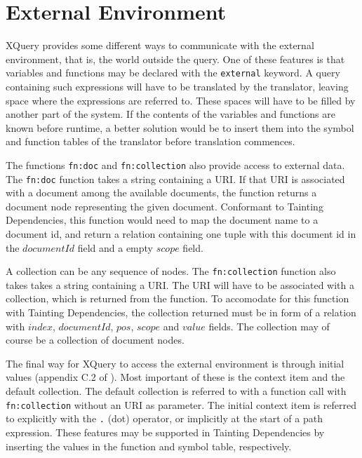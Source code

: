 \section{External Environment}
\label{sect:disc:ctxItem}

XQuery provides some different ways to communicate with the external environment, that is, the world outside the
query. One of these features is that variables and functions may be declared with the \texttt{external} keyword. A
query containing such expressions will have to be translated by the translator, leaving space where the
expressions are referred to. These spaces will have to be filled by another
part of the system. If the contents of the variables and functions are known before runtime, a better solution would be to insert them into the symbol
and function tables of the translator before translation commences.

The functions \texttt{fn:doc} and \texttt{fn:collection} also provide access to external data. The \texttt{fn:doc}
function takes a string containing a URI. If that URI is associated with a document among the available documents,
the function returns a document node representing the given document. Conformant to Tainting Dependencies, this
function would need to map the document name to a document id, and return a relation containing one tuple with
this document id in the $documentId$ field and a empty $scope$ field.

A collection can be any sequence of nodes. The \texttt{fn:collection} function also takes takes a string
containing a URI. The URI will have to be associated with a collection, which is returned from the function. To
accomodate for this function with Tainting Dependencies, the collection returned must be in form of a relation
with $index$, $documentId$, $pos$, $scope$ and $value$ fields. The collection may of course be a collection of
document nodes.

The final way for XQuery to access the external environment is through initial values (appendix C.2 of
\cite{w3c00}). Most important of these is the context item and the default collection. The default collection is
referred to with a function call with \texttt{fn:collection} without an URI as parameter. The initial context item
is referred to explicitly with the \verb!.! (dot) operator, or implicitly at the start of a path expression. These
features may be supported in Tainting Dependencies by inserting the values in
the function and symbol table, respectively.
